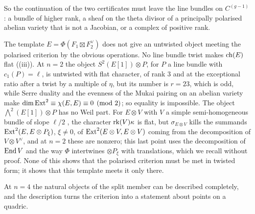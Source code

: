 So the continuation of the two certificates must leave the line bundles on
$C^{(g-1)}$: a bundle of higher rank, a sheaf on the theta divisor of a
principally polarised abelian variety that is not a Jacobian, or a complex of
positive rank.

\begin{remark}[Untwisting]\label{rem:untwisting}
The template $E=\Phi(F_{1}\boxtimes F_{2}^{\vee})$ does not give an untwisted
object meeting the polarised criterion by the obvious operations. No line
bundle twist makes $\operatorname{ch}(E)$ flat ((iii)). At $n=2$ the
object $S^{2}(E[1])\otimes P$, for $P$ a line bundle with $c_{1}(P)=\ell$, is
untwisted with flat character, of rank $3$ and at the exceptional ratio after
a twist by a multiple of $\eta$, but its number is $r=23$, which is odd, while
Serre duality and the evenness of the Mukai pairing on an abelian variety make
$\dim\operatorname{Ext}^{2}\equiv\chi(E,E)\equiv0\pmod2$; so equality is impossible. The
object $\bigwedge^{2}(E[1])\otimes P$ has no Weil part. For $E\otimes V$ with $V$ a
simple semi-homogeneous bundle of slope $\ell/2$ \cite{Muk78}, the character
$\operatorname{rk}(V)\kappa$ is flat, but $\sigma_{E\otimes V}$ kills the summands
$\operatorname{Ext}^{2}(E,E\otimes P_{\xi})$, $\xi\ne0$, of $\operatorname{Ext}^{2}(E\otimes V,E\otimes V)$
coming from the decomposition of $V\otimes V^{\vee}$, and at $n=2$ these are
nonzero; this last point uses the decomposition of $\operatorname{End} V$ and the way
$\Phi$ intertwines $\otimes P_{\xi}$ with translations, which we recall
without proof. None of this shows that the polarised criterion must be met in
twisted form; it shows that this template meets it only there.
\end{remark}

At $n=4$ the natural objects of the split member can be described completely,
and the description turns the criterion into a statement about points on a
quadric.

